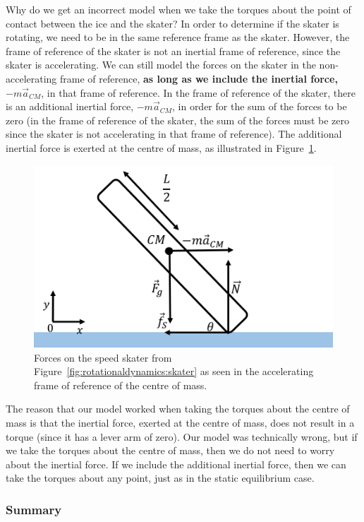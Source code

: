 Why do we get an incorrect model when we take the torques about the point of contact between the ice and the skater? In order to determine if the skater is rotating, we need to be in the same reference frame as the skater. However, the frame of reference of the skater is not an inertial frame of reference, since the skater is accelerating. We can still model the forces on the skater in the non-accelerating frame of reference, \textbf{as long as we include the inertial force, $-m\vec a_{CM}$}, in that frame of reference. In the frame of reference of the skater, there is an additional inertial force, $-m\vec a_{CM}$, in order for the sum of the forces to be zero (in the frame of reference of the skater, the sum of the forces must be zero since the skater is not accelerating in that frame of reference). The additional inertial force is exerted at the centre of mass, as illustrated in Figure~\ref{fig:rotationaldynamics:skater_fbdcm}.

\begin{figure}[!htbp]
\centering
\includegraphics[width=0.625\linewidth]{files/skater_fbdcm-216251e49c689969b105377acad7e7bb.png}
\caption[]{Forces on the speed skater from Figure~\ref{fig:rotationaldynamics:skater} as seen in the accelerating frame of reference of the centre of mass.}
\label{fig:rotationaldynamics:skater_fbdcm}
\end{figure}

The reason that our model worked when taking the torques about the centre of mass is that the inertial force, exerted at the centre of mass, does not result in a torque (since it has a lever arm of zero). Our model was technically wrong, but if we take the torques about the centre of mass, then we do not need to worry about the inertial force. If we include the additional inertial force, then we can take the torques about any point, just as in the static equilibrium case.

\subsubsection{Summary}

